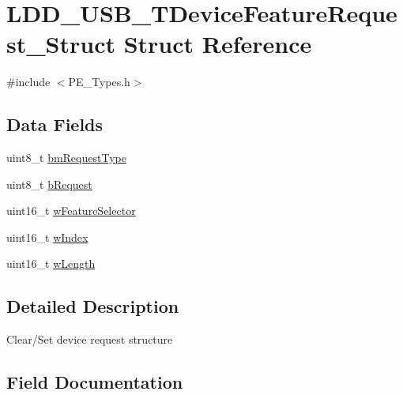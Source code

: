 \hypertarget{struct_l_d_d___u_s_b___t_device_feature_request___struct}{}\section{L\+D\+D\+\_\+\+U\+S\+B\+\_\+\+T\+Device\+Feature\+Request\+\_\+\+Struct Struct Reference}
\label{struct_l_d_d___u_s_b___t_device_feature_request___struct}


{\ttfamily \#include $<$P\+E\+\_\+\+Types.\+h$>$}

\subsection*{Data Fields}
\begin{DoxyCompactItemize}
\item 
uint8\+\_\+t \hyperlink{struct_l_d_d___u_s_b___t_device_feature_request___struct_a8258c0deaca59b3bd0c4d39c0dca9637}{bm\+Request\+Type}
\item 
uint8\+\_\+t \hyperlink{struct_l_d_d___u_s_b___t_device_feature_request___struct_a7dbfead1667063e1e2e7fb608362606a}{b\+Request}
\item 
uint16\+\_\+t \hyperlink{struct_l_d_d___u_s_b___t_device_feature_request___struct_a74dbb226786321c02ccad64b067b4ebe}{w\+Feature\+Selector}
\item 
uint16\+\_\+t \hyperlink{struct_l_d_d___u_s_b___t_device_feature_request___struct_a261267b70741fe26898665df42fec10b}{w\+Index}
\item 
uint16\+\_\+t \hyperlink{struct_l_d_d___u_s_b___t_device_feature_request___struct_af0c222aa4585a132b2582fb1c290edc7}{w\+Length}
\end{DoxyCompactItemize}


\subsection{Detailed Description}
Clear/\+Set device request structure 

\subsection{Field Documentation}
\hypertarget{struct_l_d_d___u_s_b___t_device_feature_request___struct_a8258c0deaca59b3bd0c4d39c0dca9637}{}
